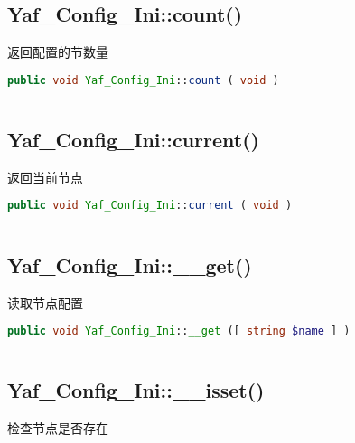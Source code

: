 \subsection{Yaf\_Config\_Ini::count()}

返回配置的节数量


\begin{lstlisting}[language=PHP]
public void Yaf_Config_Ini::count ( void )
\end{lstlisting}



\begin{lstlisting}[language=PHP]

\end{lstlisting}


\subsection{Yaf\_Config\_Ini::current()}


返回当前节点

\begin{lstlisting}[language=PHP]
public void Yaf_Config_Ini::current ( void )
\end{lstlisting}



\begin{lstlisting}[language=PHP]

\end{lstlisting}



\subsection{Yaf\_Config\_Ini::\_\_get()}


读取节点配置

\begin{lstlisting}[language=PHP]
public void Yaf_Config_Ini::__get ([ string $name ] )
\end{lstlisting}



\begin{lstlisting}[language=PHP]

\end{lstlisting}


\subsection{Yaf\_Config\_Ini::\_\_isset()}

检查节点是否存在

